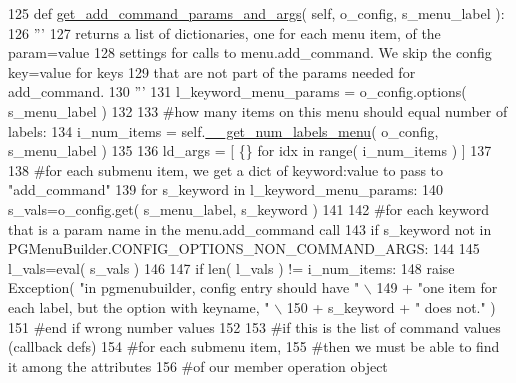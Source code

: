 \begin{DoxyCode}
125     \textcolor{keyword}{def }\hyperlink{classpgmenubuilder_1_1PGMenuBuilder_af793740cfaa34421c8ebcc338e5bc3e2}{get\_add\_command\_params\_and\_args}( self,  o\_config, s\_menu\_label ):
126         \textcolor{stringliteral}{'''}
127 \textcolor{stringliteral}{        returns a list of dictionaries, one for each menu item, of the param=value}
128 \textcolor{stringliteral}{        settings for calls to menu.add\_command.  We skip the config key=value for keys}
129 \textcolor{stringliteral}{        that are not part of the params needed for add\_command. }
130 \textcolor{stringliteral}{        '''}
131         l\_keyword\_menu\_params = o\_config.options( s\_menu\_label )    
132 
133         \textcolor{comment}{#how many items on this menu should equal number of labels:}
134         i\_num\_items = self.\hyperlink{classpgmenubuilder_1_1PGMenuBuilder_aa7dec36b1e25e5cbbbc9ffabb2256cfa}{\_\_get\_num\_labels\_menu}( o\_config, s\_menu\_label )
135 
136         ld\_args = [ \{\} \textcolor{keywordflow}{for} idx \textcolor{keywordflow}{in} range( i\_num\_items ) ]
137 
138         \textcolor{comment}{#for each submenu item, we get a dict of keyword:value to pass to "add\_command"}
139         \textcolor{keywordflow}{for} s\_keyword \textcolor{keywordflow}{in} l\_keyword\_menu\_params:
140             s\_vals=o\_config.get( s\_menu\_label, s\_keyword )
141 
142             \textcolor{comment}{#for each keyword that is a param name in the menu.add\_command call}
143             \textcolor{keywordflow}{if} s\_keyword \textcolor{keywordflow}{not} \textcolor{keywordflow}{in} PGMenuBuilder.CONFIG\_OPTIONS\_NON\_COMMAND\_ARGS:
144 
145                 l\_vals=eval( s\_vals )
146 
147                 \textcolor{keywordflow}{if} len( l\_vals ) != i\_num\_items:
148                     \textcolor{keywordflow}{raise} Exception( \textcolor{stringliteral}{"in pgmenubuilder, config entry should have "} \(\backslash\)
149                             + \textcolor{stringliteral}{"one item for each label, but the option with keyname, "} \(\backslash\)
150                             + s\_keyword + \textcolor{stringliteral}{" does not."} )
151                 \textcolor{comment}{#end if wrong number values}
152                 
153                 \textcolor{comment}{#if this is the list of command values (callback defs) }
154                 \textcolor{comment}{#for each submenu item,}
155                 \textcolor{comment}{#then we must be able to find it among the attributes}
156                 \textcolor{comment}{#of our member operation object}

\end{DoxyCode}
